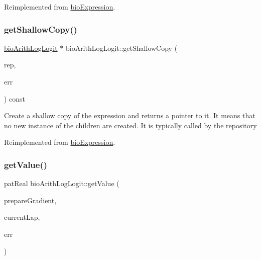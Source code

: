 Reimplemented from \hyperlink{classbio_expression_a2353a4afb3a2b0af7c63aba086a72bde}{bio\+Expression}.

\mbox{\label{classbio_arith_log_logit_abf229e9d9897a4f5f0bc3c2e158c24f8}} 
\subsubsection{\texorpdfstring{get\+Shallow\+Copy()}{getShallowCopy()}}
{\footnotesize\ttfamily \hyperlink{classbio_arith_log_logit}{bio\+Arith\+Log\+Logit} $\ast$ bio\+Arith\+Log\+Logit\+::get\+Shallow\+Copy (\begin{DoxyParamCaption}\item[{\hyperlink{classbio_expression_repository}{bio\+Expression\+Repository} $\ast$}]{rep,  }\item[{pat\+Error $\ast$\&}]{err }\end{DoxyParamCaption}) const\hspace{0.3cm}{\ttfamily [virtual]}}

Create a shallow copy of the expression and returns a pointer to it. It means that no new instance of the children are created. It is typically called by the repository 

Reimplemented from \hyperlink{classbio_expression_a442534762693b92baaf33928979a1bf8}{bio\+Expression}.

\mbox{\label{classbio_arith_log_logit_a1d6319d3ce72bda30bc036fdf678e36c}} 
\subsubsection{\texorpdfstring{get\+Value()}{getValue()}}
{\footnotesize\ttfamily pat\+Real bio\+Arith\+Log\+Logit\+::get\+Value (\begin{DoxyParamCaption}\item[{pat\+Boolean}]{prepare\+Gradient,  }\item[{pat\+U\+Long}]{current\+Lap,  }\item[{pat\+Error $\ast$\&}]{err }\end{DoxyParamCaption})\hspace{0.3cm}{\ttfamily [virtual]}}

